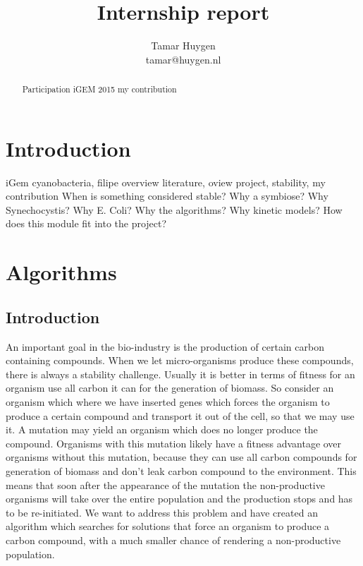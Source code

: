 \documentclass[10pt]{report}
\title{Internship report}
\author{Tamar Huygen \\ tamar@huygen.nl}
\begin{document}
\maketitle

\begin{abstract}
  Participation iGEM 2015 my contribution
\end{abstract}

\chapter{Introduction}
iGem cyanobacteria, filipe overview literature,
oview project, stability, my contribution
When is something considered stable?
Why a symbiose?
Why Synechocystis?
Why E. Coli?
Why the algorithms?
Why kinetic models?
How does this module fit into the project?

\chapter{Algorithms}

\begin{abstract}
  
\end{abstract}

\section{Introduction}
An important goal in the bio-industry is the production of certain carbon containing compounds. When we let micro-organisms produce these compounds, there is always a stability challenge. Usually it is better in terms of fitness for an organism use all carbon it can for the generation of biomass. So consider an organism which where we have inserted genes which forces the organism to produce a certain compound and transport it out of the cell, so that we may use it. A mutation may yield an organism which does no longer produce the compound. Organisms with this mutation likely have a fitness advantage over organisms without this mutation, because they can use all carbon compounds for generation of biomass and don't leak carbon compound to the environment. This means that soon after the appearance of the mutation the non-productive organisms will take over the entire population and the production stops and has to be re-initiated. We want to address this problem and have created an algorithm which searches for solutions that force an organism to produce a carbon compound, with a much smaller chance of rendering a non-productive population.
\end{document}
